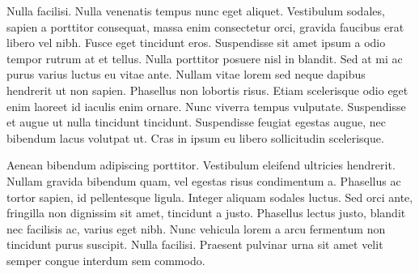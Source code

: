 Nulla facilisi. Nulla venenatis tempus nunc eget aliquet. Vestibulum sodales, sapien a porttitor consequat, massa enim consectetur orci, gravida faucibus erat libero vel nibh. Fusce eget tincidunt eros. Suspendisse sit amet ipsum a odio tempor rutrum at et tellus. Nulla porttitor posuere nisl in blandit. Sed at mi ac purus varius luctus eu vitae ante. Nullam vitae lorem sed neque dapibus hendrerit ut non sapien. Phasellus non lobortis risus. Etiam scelerisque odio eget enim laoreet id iaculis enim ornare. Nunc viverra tempus vulputate. Suspendisse et augue ut nulla tincidunt tincidunt. Suspendisse feugiat egestas augue, nec bibendum lacus volutpat ut. Cras in ipsum eu libero sollicitudin scelerisque.

Aenean bibendum adipiscing porttitor. Vestibulum eleifend ultricies hendrerit. Nullam gravida bibendum quam, vel egestas risus condimentum a. Phasellus ac tortor sapien, id pellentesque ligula. Integer aliquam sodales luctus. Sed orci ante, fringilla non dignissim sit amet, tincidunt a justo. Phasellus lectus justo, blandit nec facilisis ac, varius eget nibh. Nunc vehicula lorem a arcu fermentum non tincidunt purus suscipit. Nulla facilisi. Praesent pulvinar urna sit amet velit semper congue interdum sem commodo. 
